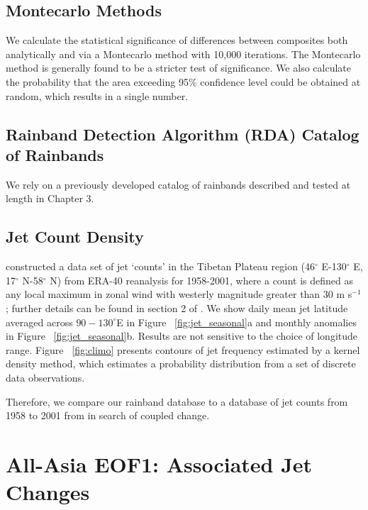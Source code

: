 \subsection{Montecarlo Methods}	
	
	We calculate the statistical significance of differences between composites both analytically and via a Montecarlo method with 10,000 iterations. The Montecarlo method is generally found to be a stricter test of significance. We also calculate the probability that the area exceeding 95\% confidence level could be obtained at random, which results in a single number.

\subsection{Rainband Detection Algorithm (RDA) Catalog of Rainbands}

	We rely on a previously developed catalog of rainbands described and tested at length in Chapter 3.

\subsection{Jet Count Density} 

	\citet{Schiemann2009} constructed a data set of jet `counts' in the Tibetan Plateau region (46$^{\circ}$ E-130$^{\circ}$ E, 17$^{\circ}$ N-58$^{\circ}$ N) from ERA-40 reanalysis for 1958-2001, where a count is defined as any local maximum in zonal wind with westerly magnitude greater than $30$ m s$^{-1}$; further details can be found in section 2 of \citet{Schiemann2009}. We show daily mean jet latitude averaged across $90-130^\circ$E in Figure ~\ref{fig:jet_seasonal}a and monthly anomalies in Figure ~\ref{fig:jet_seasonal}b. Results are not sensitive to the choice of longitude range. Figure ~\ref{fig:climo} presents contours of jet frequency estimated by a kernel density method, which estimates a probability distribution from a set of discrete data observations.
	
	Therefore, we compare our rainband database to a database of jet counts from 1958 to 2001 from \citet{Schiemann2009} in search of coupled change. 
	
\section{All-Asia EOF1: Associated Jet Changes}

